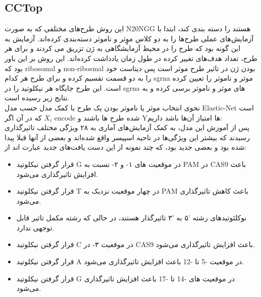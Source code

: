 \documentclass[12pt,a4paper,BCOR=.7cm,headsepline,bibliography=totoc]{report}
\begin{document}
\subsection{CCTop~\cite{CCTop}}
این روش طرح‌های مختلفی که به صورت N20NGG هستند را دسته بندی کند، ابتدا با آزمایش‌های عملی طرح‌ها را به دو کلاس موٍثر و ناموثر دسته‌بندی کرده‌اند. آزمایش به این گونه بود که طرح را  در محیط آزمایشگاهی به ژن تزریق می کردند و برای هر طرح، تعداد هدف‌های تغییر کرده در طول زمان یادداشت کرده‌اند. این روش بر این باور بود که ribosomal و non-ribosmal بودن ژن در تاثیر طرح موثر است پس دیتاست خود را به دو قسمت تقسیم کرده و برای طرح هر کدام sgrna موثر و ناموثر را تعیین کرده است. این طرح جایگاه هر نیکلوتید را در sgrna های موثر و ناموثر برسی کرده و به نتایج زیر رسیده است.\\
نحوی انتخاب موثر یا ناموثر بودن یک طرح با کمک مدل حسب مدل  Elastic-Net است که در آن اگر
 $X_i$
encode شده طرح ها باشند
و Yها امتیاز آن‌ها باشد داریم:
\\
پس از آموزش این مدل، به کمک آزمایش‌های آماری به ۲۸ ویژگی مختلف تاثیرگذاری رسیدند که بیشتر این ویژگی‌ها در ناحیه اسپیسر واقع شده‌اند و بعضی از آنها قبلا پیدا شده بود و بعضی جدید بود، که چند نمونه از این دست یافت‌های جدید عبارت اند از:
\begin{itemize}
\item
 قرار گرفتن نیکلوتید G در موقعیت های ۱- و ۲- نسبت به PAM در CAS9 باعث افزایش تاثیرگذاری می‌شود.
\item 
قرار گرفتن نیکلوتید T در چهار موقعیت نزدیک به PAM باعث کاهش تاثیرگذاری می‌شود.
\item
  نوکلئوتیدهای رشته '۵ به '۳ تاثیرگذار هستند، در حالی که رشته مکمل تاثیر قابل توجهی ندارد.
\item
قرار گرفتن نیکلوتید C در موقعیت ۳- در CAS9 باعث افزایش تاثیرگذاری می‌شود.
\item
 
قرار گرفتن نیکلوتید A در موقعیت -5 تا -12 باعث افزایش تاثیرگذاری می‌شود.
\item 
قرار گرفتن نیکلوتید G در موقعیت های -14 تا -17 باعث افزایش تاثیرگذاری می‌شود.
\end{itemize}
\end{document}
